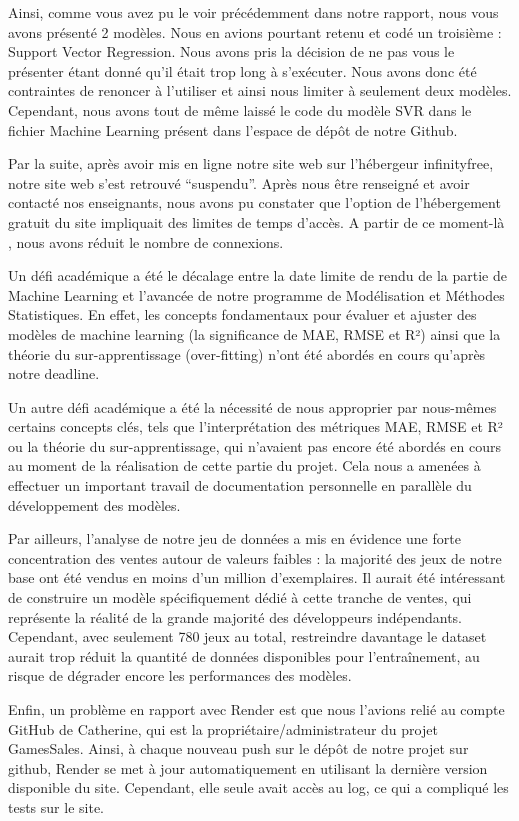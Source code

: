 \documentclass[mstat,12pt]{unswthesis}
\begin{document}
Ainsi, comme vous avez pu le voir précédemment dans notre rapport, nous vous avons présenté 2 modèles. Nous en avions pourtant retenu et codé un troisième : Support Vector Regression. Nous avons pris la décision de ne pas vous le présenter étant donné qu’il était trop long à s'exécuter. Nous avons donc été contraintes de renoncer à l’utiliser et ainsi nous limiter à seulement deux modèles. Cependant, nous avons tout de même laissé le code du modèle SVR dans le fichier Machine Learning présent dans l’espace de dépôt de notre Github.

Par la suite, après avoir mis en ligne notre site web sur l'hébergeur infinityfree, notre site web s’est retrouvé “suspendu”. Après nous être renseigné et avoir contacté nos enseignants, nous avons pu constater que l’option de l'hébergement gratuit du site impliquait des limites de temps d’accès. A partir de ce moment-là , nous avons réduit le nombre de connexions.

Un défi académique a été le décalage entre la date limite de rendu de la partie de Machine Learning et l'avancée de notre programme de Modélisation et Méthodes Statistiques. En effet, les concepts fondamentaux pour évaluer et ajuster des modèles de machine learning (la significance de MAE, RMSE et R²) ainsi que la théorie du sur-apprentissage (over-fitting) n'ont été abordés en cours qu'après notre deadline.

Un autre défi académique a été la nécessité de nous approprier par nous-mêmes certains concepts clés, tels que l'interprétation des métriques MAE, RMSE et R² ou la théorie du sur-apprentissage, qui n'avaient pas encore été abordés en cours au moment de la réalisation de cette partie du projet. Cela nous a amenées à effectuer un important travail de documentation personnelle en parallèle du développement des modèles.

Par ailleurs, l'analyse de notre jeu de données a mis en évidence une forte concentration des ventes autour de valeurs faibles : la majorité des jeux de notre base ont été vendus en moins d'un million d'exemplaires. Il aurait été intéressant de construire un modèle spécifiquement dédié à cette tranche de ventes, qui représente la réalité de la grande majorité des développeurs indépendants. Cependant, avec seulement 780 jeux au total, restreindre davantage le dataset aurait trop réduit la quantité de données disponibles pour l'entraînement, au risque de dégrader encore les performances des modèles.

Enfin, un problème en rapport avec Render est que nous l’avions relié au compte GitHub de Catherine, qui est la propriétaire/administrateur du projet GamesSales. Ainsi, à chaque nouveau push sur le dépôt de notre projet sur github, Render se met à jour automatiquement en utilisant la dernière version disponible du site. Cependant, elle seule avait accès au log, ce qui a compliqué les tests sur le site.
\end{document}

